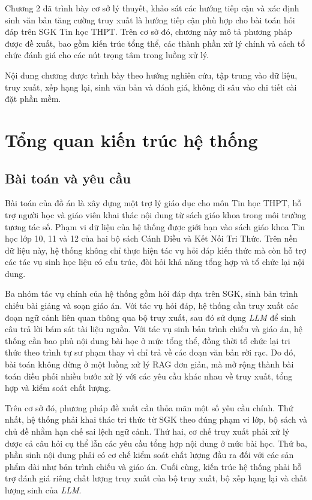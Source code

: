 \documentclass[../DoAn.tex]{subfiles}
\begin{document}
Chương 2 đã trình bày cơ sở lý thuyết, khảo sát các hướng tiếp cận và xác định sinh văn bản tăng cường truy xuất là hướng tiếp cận phù hợp cho bài toán hỏi đáp trên SGK Tin học THPT. Trên cơ sở đó, chương này mô tả phương pháp được đề xuất, bao gồm kiến trúc tổng thể, các thành phần xử lý chính và cách tổ chức đánh giá cho các nút trọng tâm trong luồng xử lý.

Nội dung chương được trình bày theo hướng nghiên cứu, tập trung vào dữ liệu, truy xuất, xếp hạng lại, sinh văn bản và đánh giá, không đi sâu vào chi tiết cài đặt phần mềm.

\section{Tổng quan kiến trúc hệ thống}

\subsection{Bài toán và yêu cầu}

Bài toán của đồ án là xây dựng một trợ lý giáo dục cho môn Tin học THPT, hỗ trợ người học và giáo viên khai thác nội dung từ sách giáo khoa trong môi trường tương tác số. Phạm vi dữ liệu của hệ thống được giới hạn vào sách giáo khoa Tin học lớp 10, 11 và 12 của hai bộ sách Cánh Diều và Kết Nối Tri Thức. Trên nền dữ liệu này, hệ thống không chỉ thực hiện tác vụ hỏi đáp kiến thức mà còn hỗ trợ các tác vụ sinh học liệu có cấu trúc, đòi hỏi khả năng tổng hợp và tổ chức lại nội dung.

Ba nhóm tác vụ chính của hệ thống gồm hỏi đáp dựa trên SGK, sinh bản trình chiếu bài giảng và soạn giáo án. Với tác vụ hỏi đáp, hệ thống cần truy xuất các đoạn ngữ cảnh liên quan thông qua bộ truy xuất, sau đó sử dụng \textit{LLM} để sinh câu trả lời bám sát tài liệu nguồn. Với tác vụ sinh bản trình chiếu và giáo án, hệ thống cần bao phủ nội dung bài học ở mức tổng thể, đồng thời tổ chức lại tri thức theo trình tự sư phạm thay vì chỉ trả về các đoạn văn bản rời rạc. Do đó, bài toán không dừng ở một luồng xử lý RAG đơn giản, mà mở rộng thành bài toán điều phối nhiều bước xử lý với các yêu cầu khác nhau về truy xuất, tổng hợp và kiểm soát chất lượng.

Trên cơ sở đó, phương pháp đề xuất cần thỏa mãn một số yêu cầu chính. Thứ nhất, hệ thống phải khai thác tri thức từ SGK theo đúng phạm vi lớp, bộ sách và chủ đề nhằm hạn chế sai lệch ngữ cảnh. Thứ hai, cơ chế truy xuất phải xử lý được cả câu hỏi cụ thể lẫn các yêu cầu tổng hợp nội dung ở mức bài học. Thứ ba, phần sinh nội dung phải có cơ chế kiểm soát chất lượng đầu ra đối với các sản phẩm dài như bản trình chiếu và giáo án. Cuối cùng, kiến trúc hệ thống phải hỗ trợ đánh giá riêng chất lượng truy xuất của bộ truy xuất, bộ xếp hạng lại và chất lượng sinh của \textit{LLM}.
\end{document}

